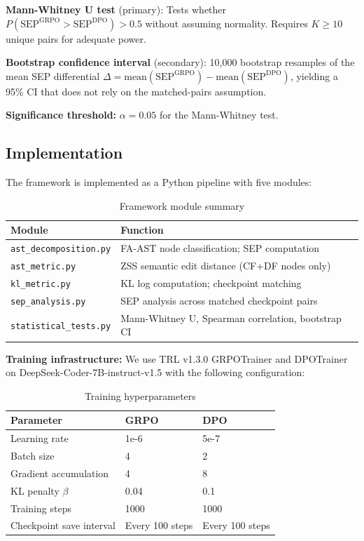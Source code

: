 \textbf{Mann-Whitney U test} (primary): Tests whether $P(\text{SEP}^\text{GRPO} > \text{SEP}^\text{DPO}) > 0.5$
without assuming normality. Requires $K \geq 10$ unique pairs for adequate power.

\textbf{Bootstrap confidence interval} (secondary): 10,000 bootstrap resamples of
the mean SEP differential $\Delta = \text{mean}(\text{SEP}^\text{GRPO}) - \text{mean}(\text{SEP}^\text{DPO})$,
yielding a 95\% CI that does not rely on the matched-pairs assumption.

\textbf{Significance threshold:} $\alpha = 0.05$ for the Mann-Whitney test.

\subsection{Implementation}

The framework is implemented as a Python pipeline with five modules:

\begin{table}[h]
\centering
\caption{Framework module summary}
\label{tab:modules}
\begin{tabular}{ll}
\toprule
\textbf{Module} & \textbf{Function} \\
\midrule
\texttt{ast\_decomposition.py} & FA-AST node classification; SEP computation \\
\texttt{ast\_metric.py} & ZSS semantic edit distance (CF+DF nodes only) \\
\texttt{kl\_metric.py} & KL log computation; checkpoint matching \\
\texttt{sep\_analysis.py} & SEP analysis across matched checkpoint pairs \\
\texttt{statistical\_tests.py} & Mann-Whitney U, Spearman correlation, bootstrap CI \\
\bottomrule
\end{tabular}
\end{table}

\textbf{Training infrastructure:} We use TRL v1.3.0 \cite{vonWerra2020TRL}
GRPOTrainer and DPOTrainer on DeepSeek-Coder-7B-instruct-v1.5
\cite{Guo2024DeepSeek} with the following configuration:

\begin{table}[h]
\centering
\caption{Training hyperparameters}
\label{tab:hyperparams}
\begin{tabular}{lll}
\toprule
\textbf{Parameter} & \textbf{GRPO} & \textbf{DPO} \\
\midrule
Learning rate & 1e-6 & 5e-7 \\
Batch size & 4 & 2 \\
Gradient accumulation & 4 & 8 \\
KL penalty $\beta$ & 0.04 & 0.1 \\
Training steps & 1000 & 1000 \\
Checkpoint save interval & Every 100 steps & Every 100 steps \\
\bottomrule
\end{tabular}
\end{table}

